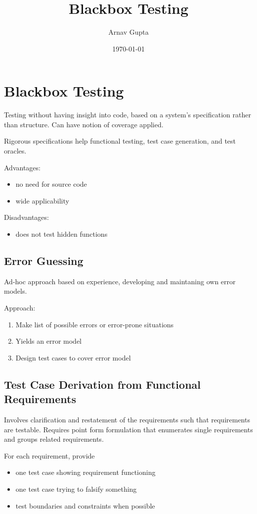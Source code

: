 \documentclass[11pt]{article}
\author{Arnav Gupta}
\date{\today}
\title{Blackbox Testing}
\begin{document}
\maketitle
\tableofcontents

\section{Blackbox Testing}
\label{sec:org90884de}
Testing without having insight into code, based on a system's specification rather
than structure. Can have notion of coverage applied.

Rigorous specifications help functional testing, test case generation, and test
oracles.

Advantages:
\begin{itemize}
\item no need for source code
\item wide applicability
\end{itemize}

Disadvantages:
\begin{itemize}
\item does not test hidden functions
\end{itemize}
\subsection{Error Guessing}
\label{sec:orgd3cb772}
Ad-hoc approach based on experience, developing and maintaning own error models.

Approach:
\begin{enumerate}
\item Make list of possible errors or error-prone situations
\item Yields an error model
\item Design test cases to cover error model
\end{enumerate}
\subsection{Test Case Derivation from Functional Requirements}
\label{sec:orgbed97da}
Involves clarification and restatement of the requirements such that requirements
are testable. Requires point form formulation that enumerates single requirements
and groups related requirements.

For each requirement, provide
\begin{itemize}
\item one test case showing requirement functioning
\item one test case trying to falsify something
\item test boundaries and constraints when possible
\end{itemize}
\end{document}
